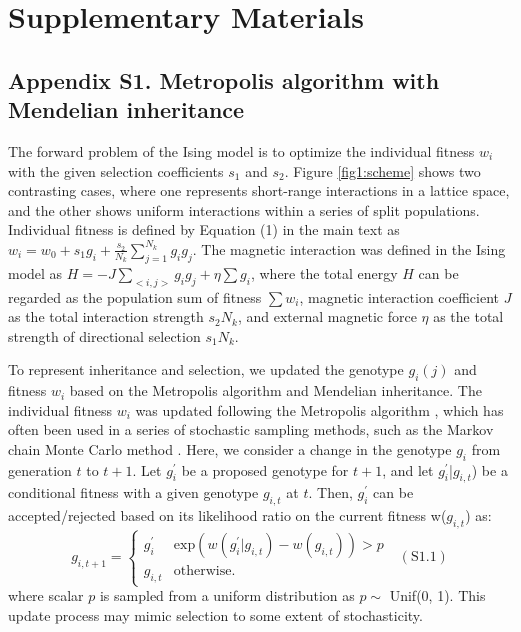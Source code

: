 \documentclass[12pt,]{article}
\newcommand{\beginsupplement}{%
        \setcounter{table}{0}
        \renewcommand{\thetable}{S\arabic{table}}%
        \setcounter{figure}{0}
        \renewcommand{\thefigure}{S\arabic{figure}}%
     }
\begin{document}
\renewcommand\refname{References}

\newpage

\clearpage

\section*{Supplementary Materials}
\beginsupplement

\medskip

\subsection*{Appendix S1. Metropolis algorithm with Mendelian inheritance}
The forward problem of the Ising model is to optimize the individual fitness $w_i$ with the given selection coefficients $s_1$ and $s_2$. Figure \ref{fig1:scheme} shows two contrasting cases, where one represents short-range interactions in a lattice space, and the other shows uniform interactions within a series of split populations. Individual fitness is defined by Equation (1) in the main text as $w_i = w_0 + s_1 g_i + \frac{s_2}{N_k}\sum^{N_{k}}_{j=1}{g_ig_j}$. The magnetic interaction was defined in the Ising model as $H = -J\sum_{<i,j>}{g_ig_j} + \eta\sum{g_i}$, where the total energy $H$ can be regarded as the population sum of fitness $\sum{w_i}$, magnetic interaction coefficient $J$ as the total interaction strength $s_2N_k$, and external magnetic force $\eta$ as the total strength of directional selection $s_1N_k$.

To represent inheritance and selection, we updated the genotype $g_i(j)$ and fitness $w_i$ based on the Metropolis algorithm and Mendelian inheritance. The individual fitness $w_i$ was updated following the Metropolis algorithm \citep{metropolis1953equation}, which has often been used in a series of stochastic sampling methods, such as the Markov chain Monte Carlo method \citep{bishop2006_11}. Here, we consider a change in the genotype $g_i$ from generation $t$ to $t+1$. Let $g^\prime_i$ be a proposed genotype for $t+1$, and let $g^\prime_i$|$g_{i,t}$) be a conditional fitness with a given genotype $g_{i,t}$ at $t$. Then, $g^\prime_i$ can be accepted/rejected based on its likelihood ratio on the current fitness w($g_{i,t}$) as:
\[
  g_{i,t+1} = \begin{cases}
    g_i^\prime & \mathrm{exp}(w(g^\prime_i|g_{i,t}) - w(g_{i,t})) > p \\
    g_{i,t} & \mathrm{otherwise.}
  \end{cases}~~~(\mathrm{S1.1})
\]
where scalar $p$ is sampled from a uniform distribution as $p \sim$ Unif(0, 1). This update process may mimic selection to some extent of stochasticity.
\end{document}
